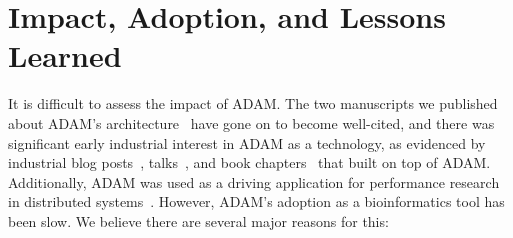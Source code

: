 \documentclass[phd]{ucbthesis}
\begin{document}
\section{Impact, Adoption, and Lessons Learned}
\label{sec:impact}

It is difficult to assess the impact of ADAM. The two manuscripts we
published about ADAM's architecture~\cite{massie13, nothaft15} have gone on to
become well-cited, and there was significant early industrial interest in ADAM
as a technology, as evidenced by industrial blog posts~\cite{friedman16,
  siegel16}, talks~\cite{day15, laserson14}, and book chapters~\cite{white15,
  wills15} that built on top of ADAM. Additionally, ADAM was used as a driving
application for performance research in distributed
systems~\cite{venkataraman16ernest}. However, ADAM's adoption as a
bioinformatics tool has been slow. We believe there are several major
reasons for this:
\end{document}
